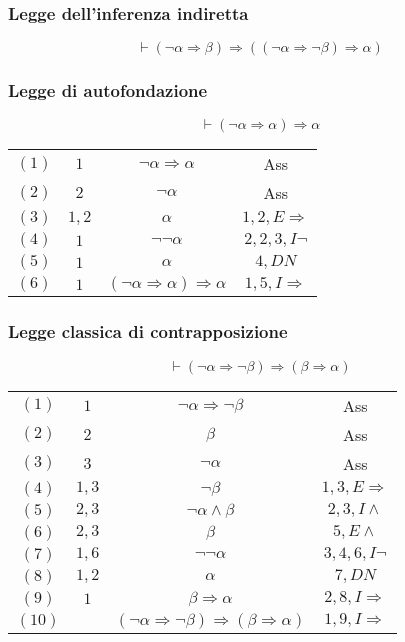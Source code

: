 \subsubsection{Legge dell'inferenza indiretta}
\begin{equation}
\vdash(\neg\alpha\Rightarrow\beta)\Rightarrow((\neg\alpha\Rightarrow\neg\beta)\Rightarrow\alpha)
\end{equation}
\subsubsection{Legge di autofondazione}
\begin{equation}
\vdash(\neg\alpha\Rightarrow\alpha)\Rightarrow\alpha
\end{equation}
\begin{tabular}{c c c c}
$(1)$& $1$ & $\neg\alpha\Rightarrow\alpha$ & Ass\\
$(2)$& $2$ & $\neg\alpha$ & Ass\\
$(3)$ & $1, 2$ & $\alpha$& $1,2, E\Rightarrow$\\
$(4)$ & $1$ & $\neg\neg\alpha$ & $2,2, 3, I\neg$\\
$(5)$ &  $1$ & $\alpha$ & $4, DN$\\
$(6)$ &  $1$ & $(\neg\alpha\Rightarrow\alpha)\Rightarrow\alpha$ & $1, 5, I\Rightarrow$\\
\end{tabular}
\subsubsection{Legge classica di contrapposizione}
\begin{equation}
\vdash(\neg\alpha\Rightarrow\neg\beta)\Rightarrow(\beta\Rightarrow\alpha)
\end{equation}
\begin{tabular}{c c c c}
$(1)$& $1$ & $\neg\alpha\Rightarrow\neg\beta$ & Ass\\
$(2)$& $2$ & $\beta$ & Ass\\
$(3)$ & $3$ & $\neg\alpha$& Ass\\
$(4)$ & $1, 3$ & $\neg\beta$ & $1,3 , E\Rightarrow$\\
$(5)$ & $2, 3$ & $\neg\alpha\land\beta$ & $2,3, I\land$\\
$(6)$ &  $2, 3$ & $\beta$ & $5, E\land$\\
$(7)$ &  $1, 6$ & $\neg\neg\alpha$ & $3,4,6, I\neg$\\
$(8)$ &  $1,2$ & $\alpha$ & $7, DN$\\
$(9)$ &  $1$ & $\beta\Rightarrow\alpha$ & $2, 8, I\Rightarrow$\\
$(10)$ &  & $(\neg\alpha\Rightarrow\neg\beta)\Rightarrow(\beta\Rightarrow\alpha)$ & $1, 9, I\Rightarrow$\\
\end{tabular}
